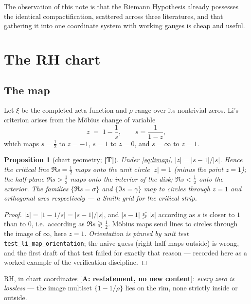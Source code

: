 \documentclass[11pt]{article}
\newtheorem{proposition}{Proposition}
\theoremstyle{remark}
\newcommand{\gr}[1]{\textbf{[#1]}} %
\begin{document}
The observation of this note is that the Riemann Hypothesis already possesses the identical
compactification, scattered across three literatures, and that gathering it into one
coordinate system with working gauges is cheap and useful.

\section{The RH chart}

\subsection{The map}

Let $\xi$ be the completed zeta function and $\rho$ range over its nontrivial zeros. Li's
criterion arises from the M\"obius change of variable
\begin{equation}
z \;=\; 1-\frac1s, \qquad s=\frac{1}{1-z},
\label{eq:limap}
\end{equation}
which maps $s=\tfrac12$ to $z=-1$, $s=1$ to $z=0$, and $s=\infty$ to $z=1$.

\begin{proposition}[chart geometry; \gr{T}]
Under \eqref{eq:limap}, $|z| = |s-1|/|s|$. Hence the critical line $\Re s=\tfrac12$ maps
onto the unit circle $|z|=1$ (minus the point $z=1$); the half-plane $\Re s>\tfrac12$ maps
onto the \emph{interior} of the disk; $\Re s<\tfrac12$ onto the exterior. The families
$\{\Re s=\sigma\}$ and $\{\Im s=\gamma\}$ map to circles through $z=1$ and orthogonal arcs
respectively --- a Smith grid for the critical strip.
\end{proposition}

\begin{proof}
$|z|=|1-1/s|=|s-1|/|s|$, and $|s-1|\lessgtr|s|$ according as $s$ is closer to $1$ than to
$0$, i.e.\ according as $\Re s \gtrless \tfrac12$. M\"obius maps send lines to circles
through the image of $\infty$, here $z=1$. \emph{Orientation is pinned by unit test}
\texttt{test\_li\_map\_orientation}; the naive guess (right half maps outside) is wrong,
and the first draft of that test failed for exactly that reason --- recorded here as a
worked example of the verification discipline.
\end{proof}

RH, in chart coordinates \gr{A: restatement, no new content}: \emph{every zero is lossless}
--- the image multiset $\{1-1/\rho\}$ lies on the rim, none strictly inside or outside.
\end{document}
